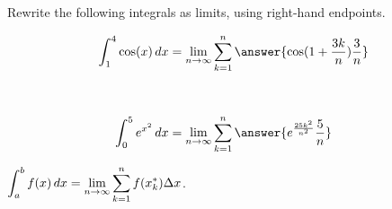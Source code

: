 \documentclass{ximera}
\author{Bobby Ramsey}
\begin{document}
\begin{exercise}
	Rewrite the following integrals as limits, using right-hand endpoints.

	\begin{align*}
		\int_1^4 \cos(x) \d x &= \lim_{n\to\infty} \sum_{k=1}^{n} \answer{\cos( 1+ \frac{3k}{n} ) \frac{3}{n}} \\ \\ \\
		\int_0^5 e^{x^2} \d x &= \lim_{n\to\infty} \sum_{k=1}^{n} \answer{e^{\frac{25k^2}{n^2}} \frac{5}{n}}
	\end{align*}
	\begin{hint}
		$\displaystyle \int_a^b f(x) \mathop{}\!d x = \lim_{n\to\infty} \sum_{k=1}^n f(x_k^*) \Delta x$.
	\end{hint}
\end{exercise}
\end{document}
